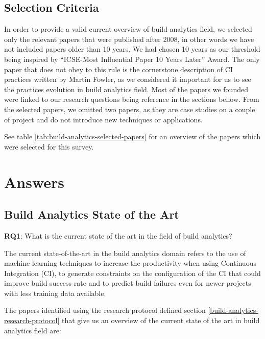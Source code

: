 \documentclass[]{book}
\begin{document}
\subsection{Selection Criteria}\label{selection-criteria}

In order to provide a valid current overview of build analytics field,
we selected only the relevant papers that were published after 2008, in
other words we have not included papers older than 10 years. We had
chosen 10 years as our threshold being inspired by ``ICSE-Most
Influential Paper 10 Years Later'' Award. The only paper that does not
obey to this rule is the cornerstone description of CI practices written
by Martin Fowler, as we considered it important for us to see the
practices evolution in build analytics field. Most of the papers we
founded were linked to our research questions being reference in the
sections bellow. From the selected papers, we omitted two papers, as
they are case studies on a couple of project and do not introduce new
techniques or applications.

See table \ref{tab:build-analytics-selected-papers} for an overview of
the papers which were selected for this survey.

\section{Answers}\label{answers}

\subsection{Build Analytics State of the
Art}\label{build-analytics-state-of-the-art}

\textbf{RQ1}: What is the current state of the art in the field of build
analytics?

The current state-of-the-art in the build analytics domain refers to the
use of machine learning techniques to increase the productivity when
using Continuous Integration (CI), to generate constraints on the
configuration of the CI that could improve build success rate and to
predict build failures even for newer projects with less training data
available.

The papers identified using the research protocol defined section
\ref{build-analytics-research-protocol} that give us an overview of the
current state of the art in build analytics field are:
\end{document}
